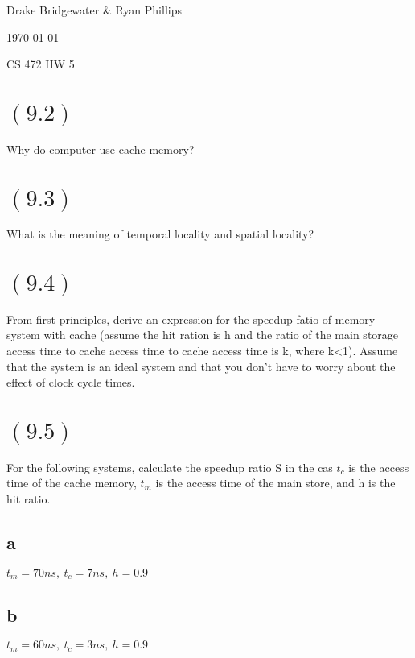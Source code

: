 \documentclass[letterpaper,12pt,titlepage]{article}
\def\name{Drake Bridgewater \& Ryan Phillips}
\begin{document}
\hfill \name

\hfill \today

\hfill CS 472 HW 5

\section*{$(9.2)$} Why do computer use cache memory?

\begin{mdframed}[style=MyFrame]
\end{mdframed}

\section*{$(9.3)$} What is the meaning of temporal locality and spatial locality?

\begin{mdframed}[style=MyFrame]
\end{mdframed}

\section*{$(9.4)$} From first principles, derive an expression for the speedup fatio of memory system with cache (assume the hit ration is h and the ratio of the main storage access time to cache access time to cache access time is k, where k<1). Assume that the system is an ideal system and that you don't have to worry about the effect of clock cycle times.

\begin{mdframed}[style=MyFrame]
\end{mdframed}

\section*{$(9.5)$} For the following systems, calculate the speedup ratio S in the cas $t_c$ is the access time of the cache memory, $t_m$ is the access time of the main store, and h is the hit ratio. 
\subsection*{a} $t_m=70ns,~t_c=7ns,~h=0.9$
\begin{mdframed}[style=MyFrame]
\end{mdframed}
\subsection*{b} $t_m=60ns,~t_c=3ns,~h=0.9$
\begin{mdframed}[style=MyFrame]
\end{mdframed}
\end{document}

